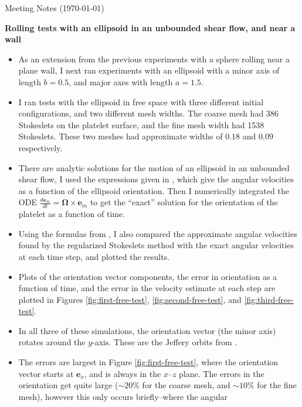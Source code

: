 \documentclass{article}
\newcommand{\vect}[1]{\boldsymbol{\mathbf{#1}}}
\begin{document}
\pagestyle{plain}

\begin{center}
  {\Large Meeting Notes (\today)}
\end{center}

{\Large \textbf{Rolling tests with an ellipsoid in an unbounded shear
    flow, and near a wall}}

\begin{itemize}
\item As an extension from the previous experiments with a sphere
  rolling near a plane wall, I next ran experiments with an ellipsoid
  with a minor axis of length $b = 0.5$, and major axes with length $a
  = 1.5$.
\item I ran tests with the ellipsoid in free space with three different
  initial configurations, and two different mesh widths. The coarse
  mesh had 386 Stokeslets on the platelet surface, and the fine mesh
  width had 1538 Stokeslets. These two meshes had approximate widths
  of $0.18$ and $0.09$ respectively.
\item There are analytic solutions for the motion of an ellipsoid in
  an unbounded shear flow, I used the expressions given in
  \cite{Kim86}, which give the angular velocities as a function of the
  ellipsoid orientation. Then I numerically integrated the ODE
  $\frac{d\vect{e}_m}{dt} = \vect{\Omega} \times \vect{e}_m$ to get the
  ``exact'' solution for the orientation of the platelet as a function
  of time.
\item Using the formulas from \cite{Kim86}, I also compared the
  approximate angular velocities found by the regularized Stokeslets
  method with the exact angular velocities at each time step, and
  plotted the results.
\item Plots of the orientation vector components, the error in
  orientation as a function of time, and the error in the velocity
  estimate at each step are plotted in Figures
  \ref{fig:first-free-test}, \ref{fig:second-free-test}, and
  \ref{fig:third-free-test}.
\item In all three of these simulations, the orientation vector (the
  minor axis) rotates around the $y$-axis. These are the Jeffery
  orbits from \cite{Jeffery22}.
\item The errors are largest in Figure \ref{fig:first-free-test},
  where the orientation vector starts at $\vect{e}_x$, and is always
  in the $x$--$z$ plane. The errors in the orientation get quite large
  ($\sim 20\%$ for the coarse mesh, and $\sim 10\%$ for the fine
  mesh), however this only occurs briefly--where the angular

\end{itemize}
\end{document}
